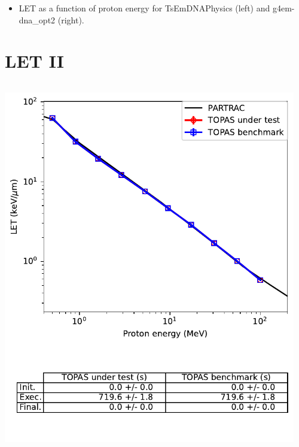 \documentclass[aspectratio=1610]{beamer}
\begin{document}
\begin{frame}{\secname}
\begin{columns}
\begin{column}{0.4\linewidth}
    \end{column}
   \end{columns}
\begin{itemize}
\item \tiny{LET as a function of proton energy for TsEmDNAPhysics (left) and g4em-dna\_opt2 (right).}
\end{itemize}
\end{frame}

\section{LET II}

\begin{frame}{\secname}
  \begin{columns}
    \begin{column}{0.4\linewidth}
     \includegraphics[width=\textwidth]{./LET/LET_g4em-dna_opt4}
    \end{column}
    \begin{column}{0.4\linewidth} 

\end{column}
\end{columns}
\end{frame}
\end{document}
